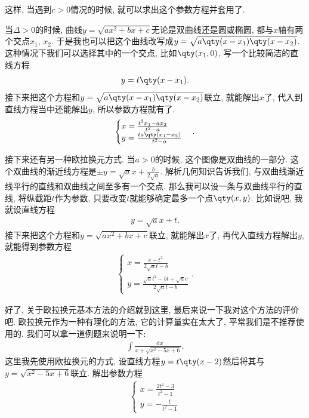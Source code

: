\documentclass{ctexbook}
\newcommand*{\dif}{\mathop{}\!\mathrm{d}}
\begin{document}
{这样, 当遇到$c>0$情况的时候, 就可以求出这个参数方程并套用了. \par
当$\Delta>0$的时候, 曲线$y=\sqrt{ax^{2}+bx+c}$无论是双曲线还是圆或椭圆, 都与$x$轴有两个交点$x_{1},\,x_{2}$. 于是我也可以把这个曲线改写成$y=\sqrt{a\qty(x-x_{1})\qty(x-x_{2})}$. 这种情况下我们可以选择其中的一个交点, 比如$\qty(x_{1},0)$, 写一个比较简洁的直线方程
\begin{align*}
y=t\qty(x-x_{1})
.\end{align*}
接下来把这个方程和$y=\sqrt{a\qty(x-x_{1})\qty(x-x_{2})}$联立, 就能解出$x$了, 代入到直线方程当中还能解出$y$, 所以参数方程就有了. 
\begin{align*}
\begin{cases}
x=\frac{t^{2}x_{1}-ax_{2}}{t^{2}-a}\\
y=\frac{ta\qty(x_{1}-x_{2})}{t^{2}-a}
\end{cases}
.\end{align*}\par
接下来还有另一种欧拉换元方式. 当$a>0$的时候, 这个图像是双曲线的一部分. 这个双曲线的渐近线方程是$\pm y=\sqrt{a}x+\frac{b}{2\sqrt{a}}$. 解析几何知识告诉我们, 与双曲线渐近线平行的直线和双曲线之间至多有一个交点. 	那么我可以设一条与双曲线平行的直线, 将纵截距$t$作为参数, 只要改变$t$就能够确定最多一个点$\qty(x,y)$. 比如说吧, 我就设直线方程
\begin{align*}
y=\sqrt{a}x+t
.\end{align*}
接下来把这个方程和$y=\sqrt{ax^{2}+bx+c}$联立, 就能解出$x$了, 再代入直线方程解出$y$, 就能得到参数方程
\begin{align*}
\begin{cases}
x=\frac{c-t^{2}}{2\sqrt{a}t-b}\\
y=\frac{\sqrt{a}t^{2}-bt+\sqrt{a}c}{2\sqrt{a}t-b}
\end{cases}
.\end{align*}\par
好了, 关于欧拉换元基本方法的介绍就到这里, 最后来说一下我对这个方法的评价吧. 欧拉换元作为一种有理化的方法, 它的计算量实在太大了, 平常我们是不推荐使用的. 我们可以拿一道例题来说明一下: 
\begin{align*}
\int\frac{\dif{x}}{x+\sqrt{x^{2}-5x+6}}
.\end{align*}
这里我先使用欧拉换元的方式, 设直线方程$y=t\qty(x-2)$然后将其与$y=\sqrt{x^{2}-5x+6}$联立. 解出参数方程
\begin{align*}
\begin{cases}
x=\frac{2t^{2}-3}{t^{2}-1}\\
y=-\frac{t}{t^{2}-1}
\end{cases}

\end{align*}}
\end{document}
